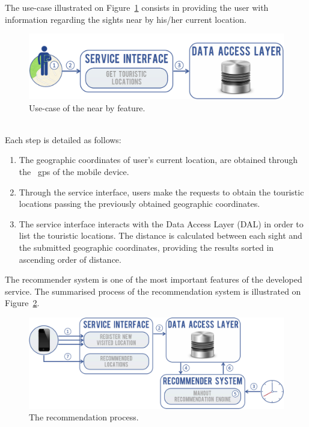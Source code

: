 The use-case illustrated on Figure~\ref{fig:useCaseFilterByLocation} consists in providing the user with information regarding the sights near by his/her current location.\\
\begin{figure}[h!]
 \centering
   \includegraphics[width=13.0 cm]{./images/diagrams/diagram_usecase_users_location.jpg}
   \caption{Use-case of the near by feature.}
   \label{fig:useCaseFilterByLocation}
\end{figure}\\
Each step is detailed as follows:
\begin{enumerate}
\item The geographic coordinates of user's current location, are obtained through the ~\gls{gps} of the mobile device.
\item Through the service interface, users make the requests to obtain the touristic locations passing the previously obtained geographic coordinates.
\item The service interface interacts with the Data Access Layer (DAL) in order to list the touristic locations. The distance is calculated between each sight and the submitted geographic coordinates, providing the results sorted in ascending order of distance.
\end{enumerate}
The recommender system is one of the most important features of the developed service. The summarised process of the recommendation system is illustrated on Figure~\ref{fig:useCaseRecommendationLocation}.\\
\begin{figure}[h!]
 \centering
   \includegraphics[width=13.0 cm]{./images/diagrams/diagram_usecase_recommender_system.jpg}
   \caption{The recommendation process.}
   \label{fig:useCaseRecommendationLocation}
\end{figure}\\
